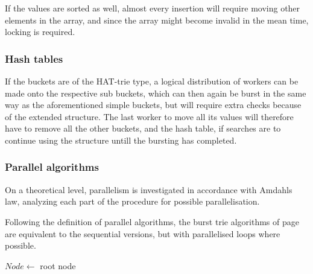 If the values are sorted as well, almost every insertion will require moving
other elements in the array, and since the array might become invalid in the
mean time, locking is required.

\subsubsection{Hash tables}
If the buckets are of the HAT-trie type, a logical distribution of workers
can be made onto the respective sub buckets, which can then again be burst in
the same way as the aforementioned simple buckets, but will require extra checks
because of the extended structure. The last worker to move all its values will
therefore have to remove all the other buckets, and the hash table, if searches
are to continue using the structure untill the bursting has completed.

\subsubsection{Parallel algorithms}
On a theoretical level, parallelism is investigated in accordance with Amdahls
law, analyzing each part of the procedure for possible parallelisation.

Following the definition of parallel algorithms, the burst trie algorithms of
page \pageref{alg:bt_insert} are equivalent to the sequential versions, but
with parallelised loops where possible.


\begin{algorithm}[H]
    \caption{$k$\FuncSty{)}}

    $Node \leftarrow$  root node\;
\end{algorithm}

